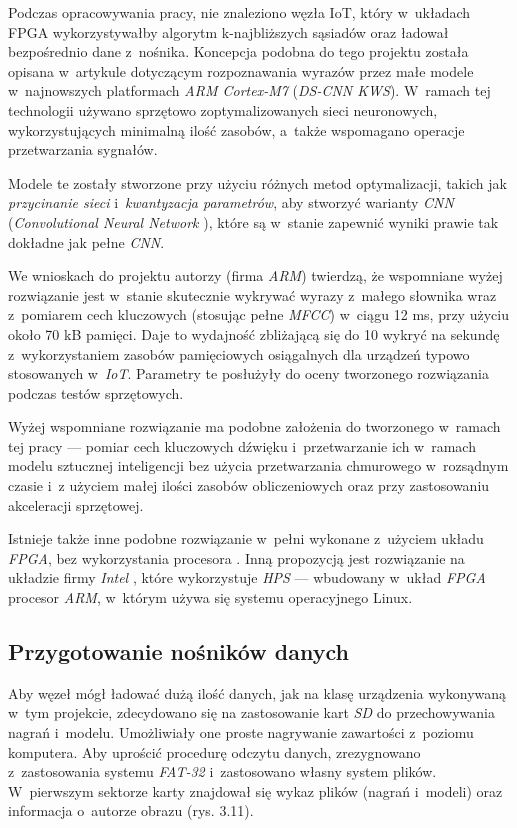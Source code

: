 Podczas opracowywania pracy, nie znaleziono węzła IoT, który w~układach FPGA wykorzystywałby algorytm k-najbliższych sąsiadów oraz ładował bezpośrednio dane z~nośnika. Koncepcja podobna do tego projektu została opisana w~artykule \cite{KWS} dotyczącym rozpoznawania wyrazów przez małe modele w~najnowszych platformach \textit{ARM Cortex-M7} (\textit{DS-CNN KWS}). W~ramach tej technologii używano sprzętowo zoptymalizowanych sieci neuronowych, wykorzystujących minimalną ilość zasobów, a~także wspomagano operacje przetwarzania sygnałów.

Modele te zostały stworzone przy użyciu różnych metod optymalizacji, takich jak \textit{przycinanie sieci} i~\textit{kwantyzacja parametrów}, aby stworzyć warianty \textit{CNN} (\textit{Convolutional Neural Network} \cite{CNN}), które są w~stanie zapewnić wyniki prawie tak dokładne jak pełne \textit{CNN}.

We wnioskach do projektu autorzy (firma \textit{ARM}) twierdzą, że wspomniane wyżej rozwiązanie jest w~stanie skutecznie wykrywać wyrazy z~małego słownika wraz z~pomiarem cech kluczowych (stosując pełne \textit{MFCC}) w~ciągu 12 ms, przy użyciu około 70 kB pamięci. Daje to wydajność zbliżającą się do 10 wykryć na sekundę z~wykorzystaniem zasobów pamięciowych osiągalnych dla urządzeń typowo stosowanych w~\textit{IoT}. Parametry te posłużyły do oceny tworzonego rozwiązania podczas testów sprzętowych.

Wyżej wspomniane rozwiązanie ma podobne założenia do tworzonego w~ramach tej pracy — pomiar cech kluczowych dźwięku i~przetwarzanie ich w~ramach modelu sztucznej inteligencji bez użycia przetwarzania chmurowego w~rozsądnym czasie i~z użyciem małej ilości zasobów obliczeniowych oraz przy zastosowaniu akceleracji sprzętowej.

Istnieje także inne podobne rozwiązanie w~pełni wykonane z~użyciem układu \textit{FPGA}, bez wykorzystania procesora \cite{FPGA:DIGIKEY}. Inną propozycją jest rozwiązanie na układzie firmy \textit{Intel} \cite{Intel:Recogn}, które wykorzystuje \textit{HPS} — wbudowany w~układ \textit{FPGA} procesor \textit{ARM}, w~którym używa się systemu operacyjnego Linux.


\subsection{Przygotowanie nośników danych}

Aby węzeł mógł ładować dużą ilość danych, jak na klasę urządzenia wykonywaną w~tym projekcie, zdecydowano się na zastosowanie kart \textit{SD} \cite{karta::SD} do przechowywania nagrań i~modelu. Umożliwiały one proste nagrywanie zawartości z~poziomu komputera. Aby uprościć procedurę odczytu danych, zrezygnowano z~zastosowania systemu \textit{FAT-32} \cite{FAT32} i~zastosowano własny system plików. W~pierwszym sektorze karty znajdował się wykaz plików (nagrań i~modeli) oraz informacja o~autorze obrazu (rys. 3.11).

